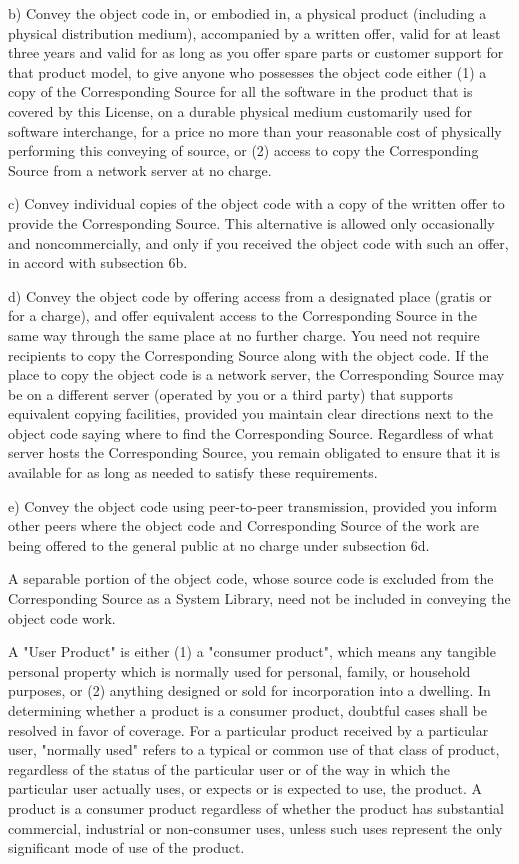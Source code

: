 b) Convey the object code in, or embodied in, a physical product
(including a physical distribution medium), accompanied by a
written offer, valid for at least three years and valid for as
long as you offer spare parts or customer support for that product
model, to give anyone who possesses the object code either (1) a
copy of the Corresponding Source for all the software in the
product that is covered by this License, on a durable physical
medium customarily used for software interchange, for a price no
more than your reasonable cost of physically performing this
conveying of source, or (2) access to copy the
Corresponding Source from a network server at no charge.

c) Convey individual copies of the object code with a copy of the
written offer to provide the Corresponding Source.  This
alternative is allowed only occasionally and noncommercially, and
only if you received the object code with such an offer, in accord
with subsection 6b.

d) Convey the object code by offering access from a designated
place (gratis or for a charge), and offer equivalent access to the
Corresponding Source in the same way through the same place at no
further charge.  You need not require recipients to copy the
Corresponding Source along with the object code.  If the place to
copy the object code is a network server, the Corresponding Source
may be on a different server (operated by you or a third party)
that supports equivalent copying facilities, provided you maintain
clear directions next to the object code saying where to find the
Corresponding Source.  Regardless of what server hosts the
Corresponding Source, you remain obligated to ensure that it is
available for as long as needed to satisfy these requirements.

e) Convey the object code using peer-to-peer transmission, provided
you inform other peers where the object code and Corresponding
Source of the work are being offered to the general public at no
charge under subsection 6d.

A separable portion of the object code, whose source code is excluded
from the Corresponding Source as a System Library, need not be
included in conveying the object code work.

A "User Product" is either (1) a "consumer product", which means any
tangible personal property which is normally used for personal, family,
or household purposes, or (2) anything designed or sold for incorporation
into a dwelling.  In determining whether a product is a consumer product,
doubtful cases shall be resolved in favor of coverage.  For a particular
product received by a particular user, "normally used" refers to a
typical or common use of that class of product, regardless of the status
of the particular user or of the way in which the particular user
actually uses, or expects or is expected to use, the product.  A product
is a consumer product regardless of whether the product has substantial
commercial, industrial or non-consumer uses, unless such uses represent
the only significant mode of use of the product.

